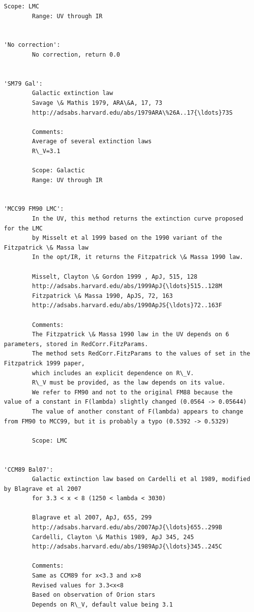 \documentclass[11pt]{article}
\begin{document}
\begin{Verbatim}[commandchars=\\\{\}]
        Scope: LMC
        Range: UV through IR

        
'No correction': 
        No correction, return 0.0
        
        
'SM79 Gal': 
        Galactic extinction law
        Savage \& Mathis 1979, ARA\&A, 17, 73
        http://adsabs.harvard.edu/abs/1979ARA\%26A..17{\ldots}73S
        
        Comments:
        Average of several extinction laws
        R\_V=3.1
        
        Scope: Galactic
        Range: UV through IR
        
        
'MCC99 FM90 LMC': 
        In the UV, this method returns the extinction curve proposed for the LMC 
        by Misselt et al 1999 based on the 1990 variant of the Fitzpatrick \& Massa law
        In the opt/IR, it returns the Fitzpatrick \& Massa 1990 law.

        Misselt, Clayton \& Gordon 1999 , ApJ, 515, 128 
        http://adsabs.harvard.edu/abs/1999ApJ{\ldots}515..128M
        Fitzpatrick \& Massa 1990, ApJS, 72, 163
        http://adsabs.harvard.edu/abs/1990ApJS{\ldots}72..163F
        
        Comments:
        The Fitzpatrick \& Massa 1990 law in the UV depends on 6 parameters, stored in RedCorr.FitzParams.
        The method sets RedCorr.FitzParams to the values of set in the Fitzpatrick 1999 paper, 
        which includes an explicit dependence on R\_V.
        R\_V must be provided, as the law depends on its value.
        We refer to FM90 and not to the original FM88 because the value of a constant in F(lambda) slightly changed (0.0564 -> 0.05644)
        The value of another constant of F(lambda) appears to change from FM90 to MCC99, but it is probably a typo (0.5392 -> 0.5329) 
        
        Scope: LMC

        
'CCM89 Bal07': 
        Galactic extinction law based on Cardelli et al 1989, modified by Blagrave et al 2007 
        for 3.3 < x < 8 (1250 < lambda < 3030)
        
        Blagrave et al 2007, ApJ, 655, 299 
        http://adsabs.harvard.edu/abs/2007ApJ{\ldots}655..299B
        Cardelli, Clayton \& Mathis 1989, ApJ 345, 245
        http://adsabs.harvard.edu/abs/1989ApJ{\ldots}345..245C

        Comments:
        Same as CCM89 for x<3.3 and x>8
        Revised values for 3.3<x<8
        Based on observation of Orion stars
        Depends on R\_V, default value being 3.1


\end{Verbatim}
\end{document}
